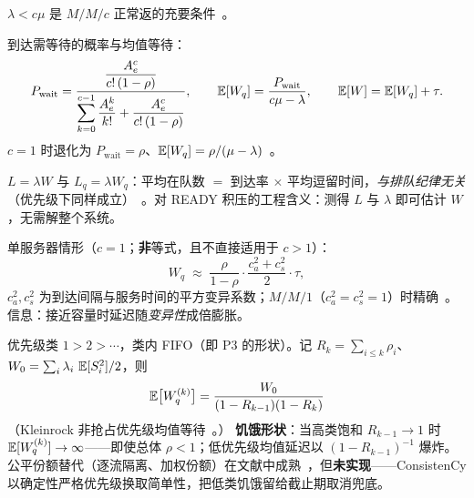 \begin{theorem}\label{thm:stability}
$\lambda<c\mu$ 是 $M/M/c$ 正常返的充要条件~\cite{kleinrock1975}。
\end{theorem}

\begin{theorem}\label{thm:erlangc}
到达需等待的概率与均值等待：
\begin{equation}
P_{\mathrm{wait}}=\frac{\dfrac{A_e^{c}}{c!\,(1-\rho)}}{\displaystyle\sum_{k=0}^{c-1}\frac{A_e^{k}}{k!}+\dfrac{A_e^{c}}{c!\,(1-\rho)}},\qquad
\operatorname{\mathbb{E}}[W_q]=\frac{P_{\mathrm{wait}}}{c\mu-\lambda},\qquad \operatorname{\mathbb{E}}[W]=\operatorname{\mathbb{E}}[W_q]+\tau.
\end{equation}
$c=1$ 时退化为 $P_{\mathrm{wait}}=\rho$、$\operatorname{\mathbb{E}}[W_q]=\rho/(\mu-\lambda)$~\cite{kleinrock1975}。
\end{theorem}

\begin{theorem}[Little 定律]\label{thm:little}
$L=\lambda W$ 与 $L_q=\lambda W_q$：平均在队数 $=$ 到达率 $\times$ 平均逗留时间，\emph{与排队纪律无关}（优先级下同样成立）~\cite{little1961}。对 READY 积压的工程含义：测得 $L$ 与 $\lambda$ 即可估计 $W$，无需解整个系统。
\end{theorem}

\begin{theorem}\label{thm:kingman}
单服务器情形（$c=1$；\textbf{非}等式，且不直接适用于 $c>1$）：
\begin{equation}
W_q\;\approx\;\frac{\rho}{1-\rho}\cdot\frac{c_a^{2}+c_s^{2}}{2}\cdot\tau,
\end{equation}
$c_a^2,c_s^2$ 为到达间隔与服务时间的平方变异系数；$M/M/1$（$c_a^2=c_s^2=1$）时精确~\cite{kingman1962}。信息：接近容量时延迟随\emph{变异性}成倍膨胀。
\end{theorem}

\begin{theorem}\label{thm:hol}
优先级类 $1>2>\cdots$，类内 FIFO（即 P3 的形状）。记 $R_k=\sum_{i\le k}\rho_i$、$W_0=\sum_i\lambda_i\,\operatorname{\mathbb{E}}[S_i^2]/2$，则
\begin{equation}
\operatorname{\mathbb{E}}\bigl[W_q^{(k)}\bigr]=\frac{W_0}{(1-R_{k-1})(1-R_k)}
\end{equation}
（Kleinrock 非抢占优先级均值等待~\cite{kleinrock1975}。）
\textbf{饥饿形状}：当高类饱和 $R_{k-1}\to1$ 时 $\operatorname{\mathbb{E}}[W_q^{(k)}]\to\infty$——即使总体 $\rho<1$；低优先级均值延迟以 $(1-R_{k-1})^{-1}$ 爆炸。公平份额替代（逐流隔离、加权份额）在文献中成熟~\cite{demers1989}，但\textbf{未实现}——ConsistenCy 以确定性严格优先级换取简单性，把低类饥饿留给截止期取消兜底。
\end{theorem}

